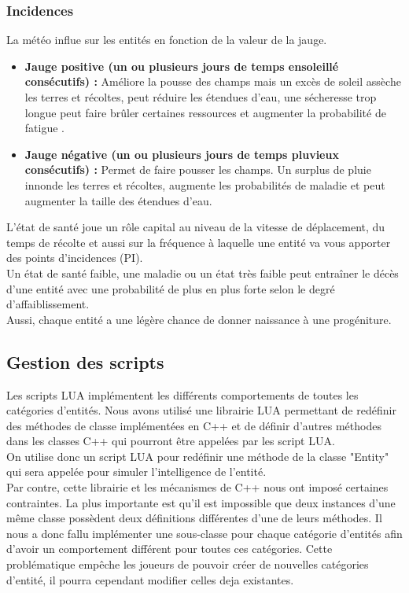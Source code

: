\documentclass[a4paper]{memoir}
\begin{document}
				\subsubsection{Incidences}
					\label{IncidenceE}
					La météo influe sur les entités en fonction de la valeur de la jauge.
					\begin{itemize}[label=$\bullet$]
						\item \textbf{Jauge positive (un ou plusieurs jours de temps ensoleillé consécutifs) :} Améliore la pousse des champs mais un excès de soleil assèche les terres et récoltes, peut réduire les étendues d'eau, une sécheresse trop longue peut faire brûler certaines ressources et augmenter la probabilité de fatigue .
						\item \textbf{Jauge négative (un ou plusieurs jours de temps pluvieux consécutifs) :} Permet de faire pousser les champs. Un surplus de pluie innonde les terres et récoltes, augmente les probabilités de maladie et peut augmenter la taille des étendues d'eau.
					\end{itemize}
					L'état de santé joue un rôle capital au niveau de la vitesse de déplacement, du temps de récolte et aussi sur la fréquence à laquelle une entité va vous apporter des points d'incidences (PI).\\
					Un état de santé faible, une maladie ou un état très faible peut entraîner le décès d'une entité avec une probabilité de plus en plus forte selon le degré d'affaiblissement.\\
					Aussi, chaque entité a une légère chance de donner naissance à une progéniture.
			
			\subsection{Gestion des scripts}
				Les scripts LUA implémentent les différents comportements de toutes les catégories d'entités. Nous avons utilisé une librairie LUA permettant de redéfinir des méthodes de classe implémentées en C++ et de définir d'autres méthodes dans les classes C++ qui pourront être appelées par les script LUA.\\
				On utilise donc un script LUA pour redéfinir une méthode de la classe "Entity" qui sera appelée pour simuler l'intelligence de l'entité.\\
				Par contre, cette librairie et les mécanismes de C++ nous ont imposé certaines contraintes. La plus importante est qu'il est impossible que deux instances d'une même classe possèdent deux définitions différentes d'une de leurs méthodes. Il nous a donc fallu implémenter une sous-classe pour chaque catégorie d'entités afin d'avoir un comportement différent pour toutes ces catégories. Cette problématique empêche les joueurs de pouvoir créer de nouvelles catégories d'entité, il pourra cependant modifier celles deja existantes.
				
\end{document}
